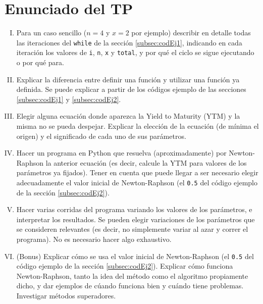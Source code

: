 \documentclass[a4paper,12pt]{article}
\begin{document}
\section{Enunciado del TP}
\label{sec:enunciado}
	\begin{enumerate}[I)]
		\item Para un caso sencillo ($n=4$ y $x=2$ por ejemplo) describir en detalle todas las iteraciones del \verb|while| de la sección \ref{subsec:codEj1}, indicando en cada iteración los valores de \verb|i|, \verb|n|, \verb|x| y \verb|total|, y por qué el ciclo se sigue ejecutando o por qué para.
		\item Explicar la diferencia entre definir una función y utilizar una función ya definida. Se puede explicar a partir de los códigos ejemplo de las secciones \ref{subsec:codEj1} y \ref{subsec:codEj2}.
		\item Elegir alguna ecuación donde aparezca la Yield to Maturity (YTM) y la misma no se pueda despejar. Explicar la elección de la ecuación (de mínima el origen) y el significado de cada uno de sus parámetros.
		\item Hacer un programa en Python que resuelva (aproximadamente) por Newton-Raphson la anterior ecuación (es decir, calcule la YTM para valores de los parámetros ya fijados). Tener en cuenta que puede llegar a ser necesario elegir adecuadamente el valor inicial de Newton-Raphson (el \verb|0.5| del código ejemplo de la sección \ref{subsec:codEj2}). 
		\item Hacer varias corridas del programa variando los valores de los parámetros, e interpretar los resultados. Se pueden elegir variaciones de los parámetros que se consideren relevantes (es decir, no simplemente variar al azar y correr el programa). No es necesario hacer algo exhaustivo.
		\item (Bonus) Explicar cómo se usa el valor inicial de Newton-Raphson (el \verb|0.5| del código ejemplo de la sección \ref{subsec:codEj2}). Explicar cómo funciona Newton-Raphson, tanto la idea del método como el algoritmo propiamente dicho, y dar ejemplos de cúando funciona bien y cuándo tiene problemas. Investigar métodos superadores.
	\end{enumerate}
\end{document}
